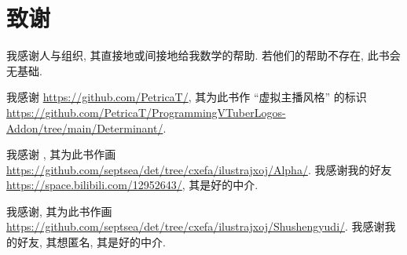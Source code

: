 \documentclass[../libro.tex]{subfiles}
\begin{document}
\ifSubfilesClassLoaded{\frontmatter}{}

\chapter{致谢}



我感谢人与组织, 其直接地或间接地给我数学的帮助.
若他们的帮助不存在, 此书会无基础.


我感谢 
\url{https://github.com/PetricaT/},
其为此书作 ``虚拟主播风格'' 的标识
\url{https://github.com/PetricaT/ProgrammingVTuberLogos-Addon/tree/main/Determinant/}.


我感谢 ,
其为此书作画
\url{https://github.com/septsea/det/tree/cxefa/ilustrajxoj/Alpha/}.
我感谢我的好友
\url{https://space.bilibili.com/12952643/},
其是好的中介.


我感谢,
其为此书作画
\url{https://github.com/septsea/det/tree/cxefa/ilustrajxoj/Shushengyudi/}.
我感谢我的好友,
其想匿名,
其是好的中介.

\vspace{4ex}\inscribe{\laauxtoro}{\ladato}

\end{document}
